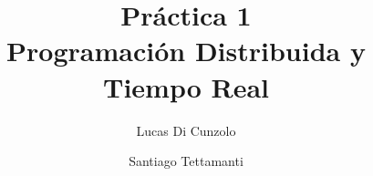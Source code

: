 \documentclass[12pt,journal,compsoc]{IEEEtran}
\begin{document}
\title{Práctica 1\\Programación Distribuida y Tiempo Real}
%
%
%
%

\author{Lucas Di Cunzolo}
\author{Santiago Tettamanti}
% 
%


% 
\end{document}
